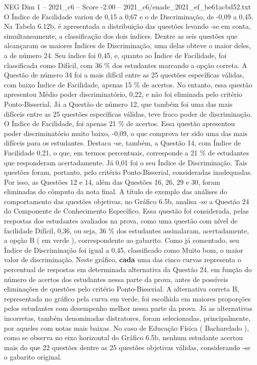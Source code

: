 \begin{textsample}{NEG Dim 1 – 2021\_c6 – Score -2.00 – 2021\_c6/enade\_2021\_ef\_be61acbd52.txt}
O Índice de Facilidade variou de 0,15 a 0,67 e o de Discriminação, de -0,09 a 0,45.
Na Tabela 6.12b, é apresentada a distribuição das questões levando -se em conta, simultaneamente, a classificação dos dois índices.
Dentre as seis questões que alcançaram os maiores Índices de Discriminação, uma delas obteve o maior deles, a de número 24.
Seu índice foi 0,45, e, quanto ao Índice de Facilidade, foi classificada como Difícil, com 36 \% dos estudantes marcando a opção correta.
A Questão de número 34 foi a mais difícil entre as 25 questões específicas válidas, com baixo Índice de Facilidade, apenas 15 \% de acertos.
No entanto, essa questão apresentou Médio poder discriminatório, 0,22, e não foi eliminada pelo critério Ponto-Bisserial.
Já a Questão de número 12, que também foi uma das mais difíceis entre as 25 questões específicas válidas, teve fraco poder de discriminação.
O Índice de Facilidade, foi apenas 21 \% de acertos.
Essa questão apresentou poder discriminatório muito baixo, -0,09, o que comprova ter sido uma das mais difíceis para os estudantes.
Destaca -se, também, a Questão 14, com Índice de Facilidade 0,21, o que, em termos percentuais, corresponde a 21 \% de estudantes que responderam acertadamente.
Já 0,01 foi o seu Índice de Discriminação.
Tais questões foram, portanto, pelo critério Ponto-Bisserial, consideradas inadequadas.
Por isso, as Questões 12 e 14, além das Questões 16, 26, 29 e 30, foram eliminadas do cômputo da nota final.
A título de exemplo das análises do comportamento das questões objetivas, no Gráfico 6.5b, analisa -se a Questão 24 do Componente de Conhecimento Específico.
Essa questão foi considerada, pelas respostas dos estudantes avaliados na prova, como uma questão com nível de facilidade Difícil, 0,36, ou seja, 36 \% dos estudantes assinalaram, acertadamente, a opção B ( em verde ), correspondente ao gabarito.
Como já comentado, seu Índice de Discriminação foi igual a 0,45, classificado como Muito bom, o maior valor de discriminação.
Neste gráfico, \textbf{cada} uma das cinco curvas representa o percentual de respostas em determinada alternativa da Questão 24, em função do número de acertos dos estudantes nessa parte da prova, antes de possíveis eliminações de questões pelo critério Ponto-Bisserial.
A alternativa correta B, representada no gráfico pela curva em verde, foi escolhida em maiores proporções pelos estudantes com desempenho melhor nessa parte da prova.
Já as alternativas incorretas, também denominadas distratores, foram selecionadas, principalmente, por aqueles com notas mais baixas.
No caso de Educação Física ( Bacharelado ), como se observa no eixo horizontal do Gráfico 6.5b, nenhum estudante acertou mais do que 22 questões dentre as 25 questões objetivas válidas, considerando -se o gabarito original.

\end{textsample}
